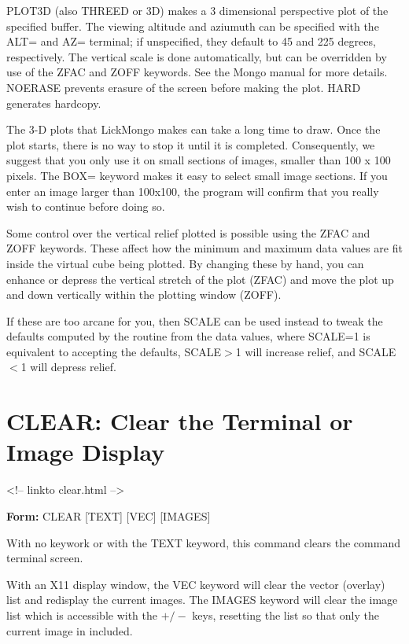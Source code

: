 PLOT3D (also THREED or 3D) makes a 3 dimensional perspective plot of the
specified buffer. The viewing altitude and aziumuth can be specified with
the ALT= and AZ= terminal; if unspecified, they default to 45 and 225
degrees, respectively. The vertical scale is done automatically, but can be
overridden by use of the ZFAC and ZOFF keywords. See the Mongo manual for
more details. NOERASE prevents erasure of the screen before making the
plot. HARD generates hardcopy.

The 3-D plots that LickMongo makes can take a long time to draw.  Once the
plot starts, there is no way to stop it until it is completed.
Consequently, we suggest that you only use it on small sections of images,
smaller than 100 x 100 pixels. The BOX= keyword makes it easy to select
small image sections. If you enter an image larger than 100x100, the
program will confirm that you really wish to continue before doing so.

Some control over the vertical relief plotted is possible using the ZFAC
and ZOFF keywords.  These affect how the minimum and maximum data values
are fit inside the virtual cube being plotted.  By changing these by hand,
you can enhance or depress the vertical stretch of the plot (ZFAC) and move
the plot up and down vertically within the plotting window (ZOFF).

If these are too arcane for you, then SCALE can be used instead to tweak
the defaults computed by the routine from the data values, where SCALE=1 is
equivalent to accepting the defaults, SCALE$>$1 will increase relief, and
SCALE$<$1 will depress relief.


\section{CLEAR: Clear the Terminal or Image Display}
\begin{rawhtml}
<!-- linkto clear.html -->
\end{rawhtml}
\begin{command}
  \item[\textbf{Form: } CLEAR {[TEXT]} {[VEC]} {[IMAGES]}\hfill]{}
\end{command}

With no keywork or with the TEXT keyword, this command clears the command
terminal screen.

With an X11 display window, the VEC keyword will clear the vector (overlay)
list and redisplay the current images. The IMAGES keyword will clear the
image list which is accessible with the $+/-$ keys, resetting the list so
that only the current image in included.


